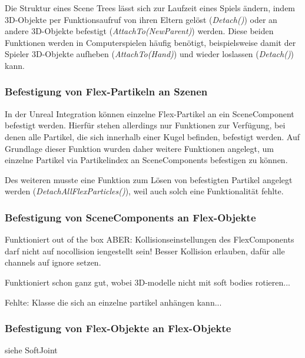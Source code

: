 
Die Struktur eines Scene Trees lässt sich zur Laufzeit eines Spiels ändern, indem 3D-Objekte per Funktionsaufruf von ihren Eltern gelöst (\textit{Detach()}) oder an andere 3D-Objekte befestigt (\textit{AttachTo(NewParent)}) werden. Diese beiden Funktionen werden in Computerspielen häufig benötigt, beispielsweise damit der Spieler 3D-Objekte aufheben (\textit{AttachTo(Hand)}) und wieder loslassen (\textit{Detach()}) kann.

\subsubsection{Befestigung von Flex-Partikeln an Szenen}

In der Unreal Integration können einzelne Flex-Partikel an ein SceneComponent befestigt werden. Hierfür stehen allerdings nur Funktionen zur Verfügung, bei denen alle Partikel, die sich innerhalb einer Kugel befinden, befestigt werden. Auf Grundlage dieser Funktion wurden daher weitere Funktionen angelegt, um einzelne Partikel via Partikelindex an SceneComponents befestigen zu können.

Des weiteren musste eine Funktion zum Lösen von befestigten Partikel angelegt werden (\textit{DetachAllFlexParticles()}), weil auch solch eine Funktionalität fehlte.



\subsubsection{Befestigung von SceneComponents an Flex-Objekte}

Funktioniert out of the box ABER: Kollisionseinstellungen des FlexComponents darf nicht auf nocollision iengestellt sein! Besser Kollision erlauben, dafür alle channels auf ignore setzen.

Funktioniert schon ganz gut, wobei 3D-modelle nicht mit soft bodies rotieren...

Fehlte:  Klasse die sich an einzelne partikel anhängen kann...

\subsubsection{Befestigung von Flex-Objekte an Flex-Objekte}

siehe SoftJoint

